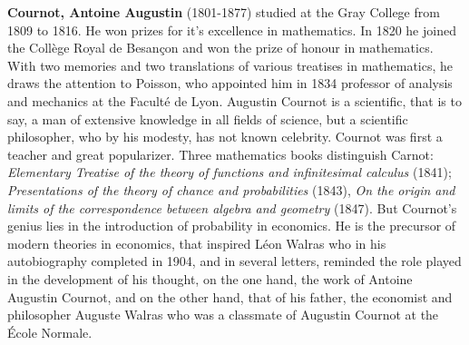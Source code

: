 \textbf{Cournot, Antoine Augustin} (1801-1877) studied at the Gray College from 1809 to 1816. He won prizes for it's excellence in mathematics. In 1820 he joined the Collège Royal de Besançon and won the prize of honour in mathematics. With two memories and two translations of various treatises in mathematics, he draws the attention to Poisson, who appointed him in 1834 professor of analysis and mechanics at the Faculté de Lyon. Augustin Cournot is a scientific, that is to say, a man of extensive knowledge in all fields of science, but a scientific philosopher, who by his modesty, has not known celebrity. Cournot was first a teacher and great popularizer. Three mathematics books distinguish Carnot: \textit{Elementary Treatise of the theory of functions and infinitesimal calculus} (1841); \textit{Presentations of the theory of chance and probabilities} (1843), \textit{On the origin and limits of the correspondence between algebra and geometry} (1847). But Cournot's genius lies in the introduction of probability in economics. He is the precursor of modern theories in economics, that inspired Léon Walras who in his autobiography completed in 1904, and in several letters, reminded the role played in the development of his thought, on the one hand, the work of Antoine Augustin Cournot, and on the other hand, that of his father, the economist and philosopher Auguste Walras who was a classmate of Augustin Cournot at the École Normale.

